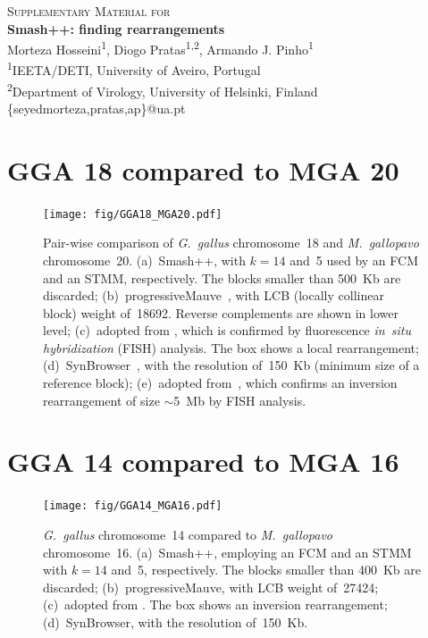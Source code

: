 \documentclass[a4paper,9pt]{extarticle}
\newcommand*{\defaultLineSpace}{\setstretch{1.15}}
\begin{document}
\begin{titlepage}
  \centering
  \vspace*{10mm}
  \Large\textsc{Supplementary Material for} \\[5mm]
  \huge\textbf{Smash++: finding rearrangements} \\[12mm]
  \Large Morteza Hosseini\textsuperscript{1}, Diogo Pratas\textsuperscript{1,2}, Armando J. Pinho\textsuperscript{1} \\[6mm]
  \normalsize \textsuperscript{1}IEETA/DETI, University of Aveiro, Portugal \\[1mm]
  \textsuperscript{2}Department of Virology, University of Helsinki, Finland \\[4mm]
  {\ttfamily\{seyedmorteza,pratas,ap\}@ua.pt}
  
  \vspace{\fill}
  \thispagestyle{empty}
  \raggedright
  \normalsize\tableofcontents
\end{titlepage}

\defaultLineSpace    		%

\clearpage
\section{GGA 18 compared to MGA 20}
\begin{figure}[!h]
  \centering
  \texttt{[image: fig/GGA18\_MGA20.pdf]}
  \caption{Pair-wise comparison of \textit{G.~gallus} chromosome~18 and \textit{M.~gallopavo} chromosome~20.
  (a)~Smash++, with $k=14$ and~5 used by an FCM and an STMM, respectively. The blocks smaller than 500~Kb are discarded;
  (b)~progressiveMauve~\cite{darling2010progressivemauve}, with LCB (locally collinear block) weight of~18692. Reverse complements are shown in lower level;
  (c)~adopted from \cite{zhang2011comparative}, which is confirmed by fluorescence \textit{in~situ hybridization} (FISH) analysis. The box shows a local rearrangement;
  (d)~SynBrowser~\cite{lee2016synteny}, with the resolution of~150~Kb (minimum size of a reference block);
  (e)~adopted from~\cite{dalloul2010multi}, which confirms an inversion rearrangement of size $\sim$5~Mb by FISH analysis.}
  \label{fig.supp.GGA18.MGA20}
\end{figure}

\clearpage
\section{GGA 14 compared to MGA 16}
\begin{figure}[!h]
  \centering
  \texttt{[image: fig/GGA14\_MGA16.pdf]}
  \caption{\textit{G.~gallus} chromosome~14 compared to \textit{M.~gallopavo} chromosome~16.
   (a)~Smash++, employing an FCM and an STMM with $k=14$ and~5, respectively. The blocks smaller than 400~Kb are discarded;
   (b)~progressiveMauve, with LCB weight of~27424;
   (c)~adopted from \cite{zhang2011comparative}. The box shows an inversion rearrangement; 
   (d)~SynBrowser, with the resolution of~150~Kb.
  }
  \label{fig.supp.GGA14.MGA16}
\end{figure}
\end{document}
